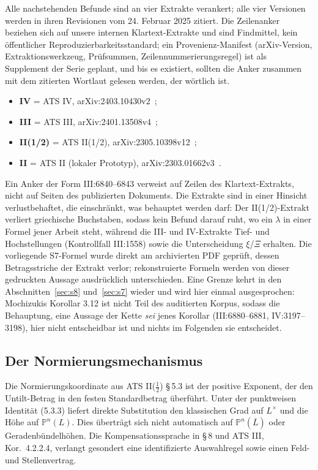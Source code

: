 \documentclass[11pt,a4paper]{article}
\theoremstyle{definition}
\theoremstyle{remark}
\begin{document}
Alle nachstehenden Befunde sind an vier Extrakte verankert; alle vier
Versionen werden in ihren Revisionen vom 24. Februar 2025 zitiert. Die
Zeilenanker beziehen sich auf unsere internen Klartext-Extrakte und sind
Findmittel, kein öffentlicher Reproduzierbarkeitsstandard; ein
Provenienz-Manifest (arXiv-Version, Extraktionswerkzeug, Prüfsummen,
Zeilennummerierungsregel) ist als Supplement der Serie geplant, und bis es
existiert, sollten die Anker zusammen mit dem zitierten Wortlaut gelesen
werden, der wörtlich ist.
\begin{itemize}
\item \textbf{IV} = ATS IV, arXiv:2403.10430v2~\cite{joshiIV};
\item \textbf{III} = ATS III, arXiv:2401.13508v4~\cite{joshiIII};
\item \textbf{II(1/2)} = ATS II(1/2), arXiv:2305.10398v12~\cite{joshiIIhalf};
\item \textbf{II} = ATS II (lokaler Prototyp), arXiv:2303.01662v3~\cite{joshiII}.
\end{itemize}
Ein Anker der Form III:6840--6843 verweist auf Zeilen des
Klartext-Extrakts, nicht auf Seiten des publizierten Dokuments. Die Extrakte
sind in einer Hinsicht verlustbehaftet, die einschränkt, was behauptet
werden darf: Der II(1/2)-Extrakt verliert griechische Buchstaben, sodass
kein Befund darauf ruht, wo ein $\lambda$ in einer Formel jener Arbeit
steht, während die III- und IV-Extrakte Tief- und Hochstellungen
(Kontrollfall III:1558) sowie die Unterscheidung $\xi$/$\Xi$ erhalten. Die vorliegende S7-Formel wurde direkt am archivierten PDF
geprüft, dessen Betragsstriche der Extrakt verlor; rekonstruierte Formeln
werden von dieser gedruckten Aussage ausdrücklich unterschieden. Eine
Grenze kehrt in den Abschnitten~\ref{sec:s8} und~\ref{sec:s7} wieder und
wird hier einmal ausgesprochen: Mochizukis Korollar 3.12 ist nicht Teil des
auditierten Korpus, sodass die Behauptung, eine Aussage der Kette
\emph{sei} jenes Korollar (III:6880--6881, IV:3197--3198), hier nicht
entscheidbar ist und nichts im Folgenden sie entscheidet.

\subsection{Der Normierungsmechanismus}\label{sec:fneu1}

Die Normierungskoordinate aus ATS II($\tfrac12$) \S\,5.3 ist der positive
Exponent, der den Untilt-Betrag in den festen Standardbetrag überführt.
Unter der punktweisen Identität (5.3.3) liefert direkte Substitution den
klassischen Grad auf $L^\times$ und die Höhe auf $\mathbb P^n(L)$. Dies
überträgt sich nicht automatisch auf $\mathbb P^n(\overline L)$ oder
Geradenbündelhöhen. Die Kompensationssprache in \S\,8 und ATS III,
Kor.~4.2.2.4, verlangt gesondert eine identifizierte Auswahlregel sowie
einen Feld- und Stellenvertrag.
\end{document}
